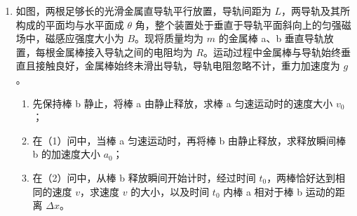 \documentclass[\gkver]{gaokaozhenti}
\begin{document}
\begin{enumerate}
{$$ \Delta F=(p_{0}-p_{n})S=[1-(\frac{V_{0}}{V_{0}+V_{1}})^{n}]p_{0}S $$
}

\item
如图，两根足够长的光滑金属直导轨平行放置，导轨间距为 $L$，两导轨及其所构成的平面均与水平面成 $\theta$ 角，整个装置处于垂直于导轨平面斜向上的匀强磁场中，磁感应强度大小为 $B$。现将质量均为 $m$ 的金属棒 a、b 垂直导轨放置，每根金属棒接入导轨之间的电阻均为 $R$。运动过程中金属棒与导轨始终垂直且接触良好，金属棒始终未滑出导轨，导轨电阻忽略不计，重力加速度为 $g$。
\begin{enumerate}
	\item
	先保持棒 b 静止，将棒 a 由静止释放，求棒 a 匀速运动时的速度大小 $v_{0}$；
	\item
	在（1）问中，当棒 a 匀速运动时，再将棒 b 由静止释放，求释放瞬间棒 b 的加速度大小 $a_{0}$；
	\item
	在（2）问中，从棒 b 释放瞬间开始计时，经过时间 $t_{0}$，两棒恰好达到相同的速度 $v$，求速度 $v$ 的大小，以及时间 $t_{0}$ 内棒 a 相对于棒 b 运动的距离 $\Delta x$。
\end{enumerate}
\end{enumerate}
\end{document}
